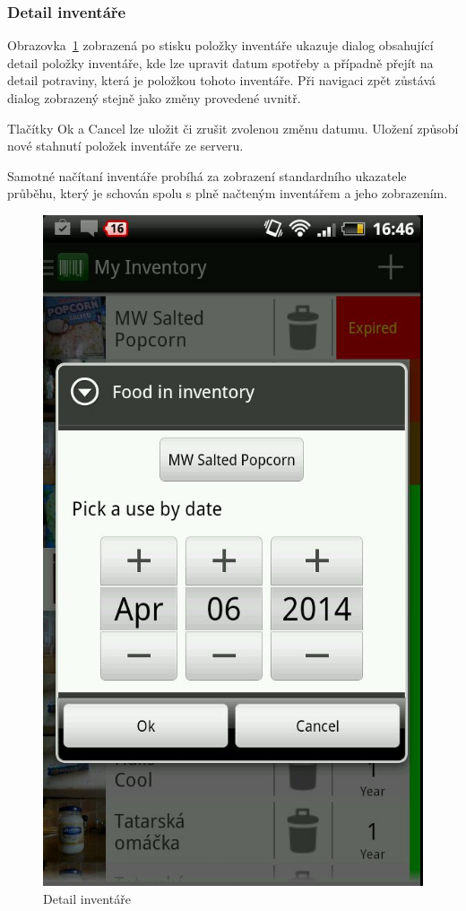 \documentclass[thesis=B,czech]{FITthesis}[2013/10/20]
\begin{document}
\clearpage

\subsubsection{Detail inventáře}

Obrazovka~\ref{fig:AppInventoryDetail} zobrazená po stisku položky inventáře ukazuje dialog obsahující detail položky inventáře, kde lze upravit datum spotřeby a případně přejít na detail potraviny, která je položkou tohoto inventáře. Při navigaci zpět zůstává dialog zobrazený stejně jako změny provedené uvnitř.

Tlačítky Ok a Cancel lze uložit či zrušit zvolenou změnu datumu. Uložení způsobí nové stahnutí položek inventáře ze serveru.

Samotné načítaní inventáře probíhá za zobrazení standardního ukazatele průběhu, který je schován spolu s plně načteným inventářem a jeho zobrazením.

\begin{figure}[H]
  \centering
  \includegraphics[scale=0.4]{screenshots/app_inventory_detail.jpg}
  \caption{Detail inventáře}
  \label{fig:AppInventoryDetail}
\end{figure}
\end{document}

